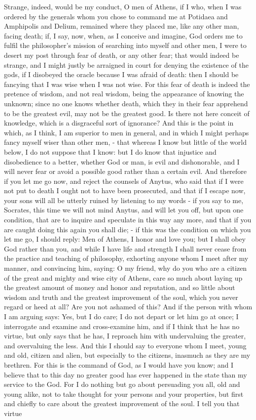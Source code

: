 \documentclass[11pt]{article}
\begin{document}
Strange, indeed, would be my conduct, O men of Athens, if I who, when I was ordered by the generals whom you chose to command me at Potidaea and Amphipolis and Delium, remained where they placed me, like any other man, facing death; if, I say, now, when, as I conceive and imagine, God orders me to fulfil the philosopher's mission of searching into myself and other men, I were to desert my post through fear of death, or any other fear; that would indeed be strange, and I might justly be arraigned in court for denying the existence of the gods, if I disobeyed the oracle because I was afraid of death: then I should be fancying that I was wise when I was not wise. For this fear of death is indeed the pretence of wisdom, and not real wisdom, being the appearance of knowing the unknown; since no one knows whether death, which they in their fear apprehend to be the greatest evil, may not be the greatest good. Is there not here conceit of knowledge, which is a disgraceful sort of ignorance? And this is the point in which, as I think, I am superior to men in general, and in which I might perhaps fancy myself wiser than other men, - that whereas I know but little of the world below, I do not suppose that I know: but I do know that injustice and disobedience to a better, whether God or man, is evil and dishonorable, and I will never fear or avoid a possible good rather than a certain evil. And therefore if you let me go now, and reject the counsels of Anytus, who said that if I were not put to death I ought not to have been prosecuted, and that if I escape now, your sons will all be utterly ruined by listening to my words - if you say to me, Socrates, this time we will not mind Anytus, and will let you off, but upon one condition, that are to inquire and speculate in this way any more, and that if you are caught doing this again you shall die; - if this was the condition on which you let me go, I should reply: Men of Athens, I honor and love you; but I shall obey God rather than you, and while I have life and strength I shall never cease from the practice and teaching of philosophy, exhorting anyone whom I meet after my manner, and convincing him, saying: O my friend, why do you who are a citizen of the great and mighty and wise city of Athens, care so much about laying up the greatest amount of money and honor and reputation, and so little about wisdom and truth and the greatest improvement of the soul, which you never regard or heed at all? Are you not ashamed of this? And if the person with whom I am arguing says: Yes, but I do care; I do not depart or let him go at once; I interrogate and examine and cross-examine him, and if I think that he has no virtue, but only says that he has, I reproach him with undervaluing the greater, and overvaluing the less. And this I should say to everyone whom I meet, young and old, citizen and alien, but especially to the citizens, inasmuch as they are my brethren. For this is the command of God, as I would have you know; and I believe that to this day no greater good has ever happened in the state than my service to the God. For I do nothing but go about persuading you all, old and young alike, not to take thought for your persons and your properties, but first and chiefly to care about the greatest improvement of the soul. I tell you that virtue 
\end{document}
